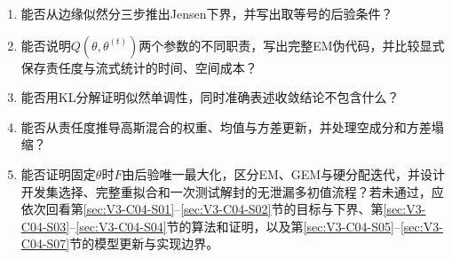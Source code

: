\begin{SLCompactClosure}
\label{struct:V3-C04-CH36}

\label{struct:V3-C04-CH37}
\begin{selfcheckbox}
\begin{enumerate}[leftmargin=2.2em]
  \item 能否从边缘似然分三步推出Jensen下界，并写出取等号的后验条件？
  \item 能否说明$Q(\theta,\theta^{(t)})$两个参数的不同职责，写出完整EM伪代码，并比较显式保存责任度与流式统计的时间、空间成本？
  \item 能否用KL分解证明似然单调性，同时准确表述收敛结论不包含什么？
  \item 能否从责任度推导高斯混合的权重、均值与方差更新，并处理空成分和方差塌缩？
  \item 能否证明固定$\theta$时$F$由后验唯一最大化，区分EM、GEM与硬分配迭代，并设计开发集选择、完整重拟合和一次测试解封的无泄漏多初值流程？若未通过，应依次回看第\ref{sec:V3-C04-S01}--\ref{sec:V3-C04-S02}节的目标与下界、第\ref{sec:V3-C04-S03}--\ref{sec:V3-C04-S04}节的算法和证明，以及第\ref{sec:V3-C04-S05}--\ref{sec:V3-C04-S07}节的模型更新与实现边界。
\end{enumerate}
\end{selfcheckbox}
\end{SLCompactClosure}
